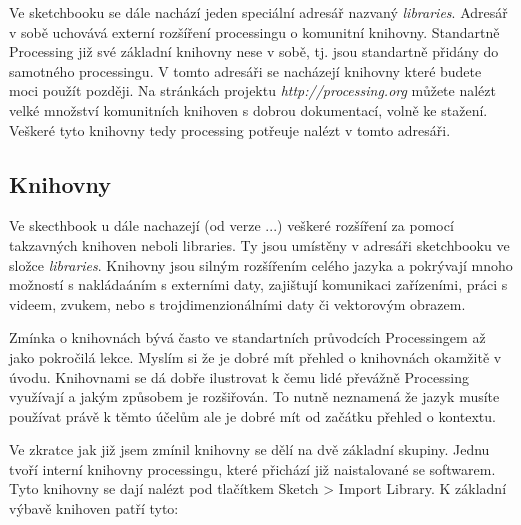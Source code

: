 \documentclass[11pt]{article} %
\begin{document}
Ve sketchbooku se dále nachází jeden speciální adresář nazvaný {\em libraries}. Adresář v sobě uchovává externí rozšíření processingu o komunitní knihovny. Standartně Processing již své základní knihovny nese v sobě, tj. jsou standartně přidány do samotného processingu. V tomto adresáři se nacházejí knihovny které budete moci použít později. Na stránkách projektu {\em http://processing.org} můžete nalézt velké množství komunitních knihoven s dobrou dokumentací, volně ke stažení. Veškeré tyto knihovny tedy processing potřeuje nalézt v tomto adresáři.

\subsection{Knihovny}

Ve skecthbook u dále nachazejí (od verze ...) veškeré rozšíření za pomocí takzavných knihoven neboli libraries. Ty jsou umístěny v adresáři sketchbooku ve složce {\em libraries}. Knihovny jsou silným rozšířením celého jazyka a pokrývají mnoho možností s nakládaáním s externími daty, zajištují komunikaci zařízeními, práci s videem, zvukem, nebo s trojdimenzionálními daty či vektorovým obrazem.

Zmínka o knihovnách bývá často ve standartních průvodcích Processingem až jako pokročilá lekce. Myslím si že je dobré mít přehled o knihovnách okamžitě v úvodu. Knihovnami se dá dobře ilustrovat k čemu lidé převážně Processing využívají a jakým způsobem je rozšiřován. To nutně neznamená že jazyk musíte používat právě k těmto účelům ale je dobré mít od začátku přehled o kontextu.

Ve zkratce jak již jsem zmínil knihovny se dělí na dvě základní skupiny. Jednu tvoří interní knihovny processingu, které přichází již naistalované se softwarem. Tyto knihovny se dají nalézt pod tlačítkem Sketch > Import Library.
K základní výbavě knihoven patří tyto:
\end{document}
